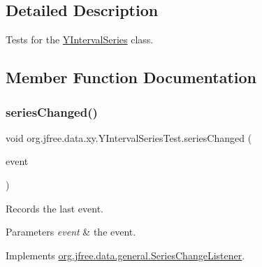 \subsection{Detailed Description}
Tests for the \mbox{\hyperlink{classorg_1_1jfree_1_1data_1_1xy_1_1_y_interval_series}{Y\+Interval\+Series}} class. 

\subsection{Member Function Documentation}
\mbox{\label{classorg_1_1jfree_1_1data_1_1xy_1_1_y_interval_series_test_a03898d82f545814b3026e56a0d455747}} 
\subsubsection{\texorpdfstring{series\+Changed()}{seriesChanged()}}
{\footnotesize\ttfamily void org.\+jfree.\+data.\+xy.\+Y\+Interval\+Series\+Test.\+series\+Changed (\begin{DoxyParamCaption}\item[{\mbox{\hyperlink{classorg_1_1jfree_1_1data_1_1general_1_1_series_change_event}{Series\+Change\+Event}}}]{event }\end{DoxyParamCaption})}

Records the last event.


\begin{DoxyParams}{Parameters}
{\em event} & the event. \\
\hline
\end{DoxyParams}


Implements \mbox{\hyperlink{interfaceorg_1_1jfree_1_1data_1_1general_1_1_series_change_listener_a441fd65d1290b91e0184124be928ebf7}{org.\+jfree.\+data.\+general.\+Series\+Change\+Listener}}.

\mbox{\label{classorg_1_1jfree_1_1data_1_1xy_1_1_y_interval_series_test_a6eb1923ff99ebe6783e82d5eb4020f6f}} 
